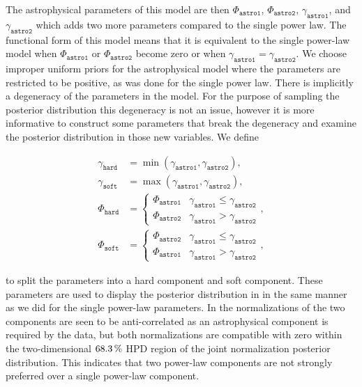 The astrophysical parameters of this model are then $\Phi_\texttt{astro1}$, $\Phi_\texttt{astro2}$, $\gamma_\texttt{astro1}$, and $\gamma_\texttt{astro2}$ which adds two more parameters compared to the single power law.
The functional form of this model means that it is equivalent to the single power-law model when $\Phi_\texttt{astro1}$ or $\Phi_\texttt{astro2}$ become zero or when $\gamma_\texttt{astro1}=\gamma_\texttt{astro2}$.
We choose improper uniform priors for the astrophysical model where the parameters are restricted to be positive, as was done for the single power law.
There is implicitly a degeneracy of the parameters in the model.
For the purpose of sampling the posterior distribution this degeneracy is not an issue, however it is more informative to construct some parameters that break the degeneracy and examine the posterior distribution in those new variables.
We define
\begin{linenomath*}
	\begin{equation}
	\begin{split}
	\gamma_\texttt{hard} &= \min (\gamma_\texttt{astro1}, \gamma_\texttt{astro2}), \\
	\gamma_\texttt{soft} &= \max (\gamma_\texttt{astro1}, \gamma_\texttt{astro2}), \\
	\Phi_\texttt{hard} &= \left\{ \begin{array}{ll} \Phi_\texttt{astro1} & \gamma_\texttt{astro1} \leq \gamma_\texttt{astro2} \\ \Phi_\texttt{astro2} & \gamma_\texttt{astro1} > \gamma_\texttt{astro2} \end{array} \right. , \\
	\Phi_\texttt{soft} &= \left\{ \begin{array}{ll} \Phi_\texttt{astro2} & \gamma_\texttt{astro1} \leq \gamma_\texttt{astro2} \\ \Phi_\texttt{astro1} & \gamma_\texttt{astro1} > \gamma_\texttt{astro2} \end{array} \right. ,
	\end{split}\label{eq:dpl_hardsoft}
	\end{equation}
\end{linenomath*}
to split the parameters into a hard component and soft component.
These parameters are used to display the posterior distribution in  in the same manner as we did for the single power-law parameters.
In  the normalizations of the two components are seen to be anti-correlated as an astrophysical component is required by the data, but both normalizations are compatible with zero within the two-dimensional $\SI{68.3}\percent$ HPD region of the joint normalization posterior distribution.
This indicates that two power-law components are not strongly preferred over a single power-law component.

